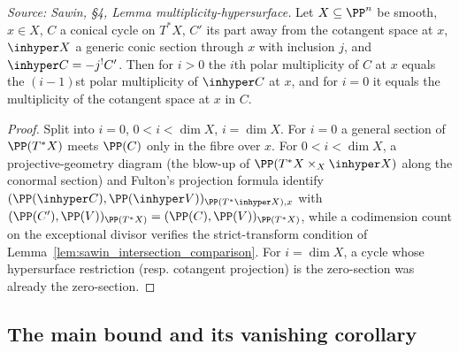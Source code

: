 \begin{lemma}
  \label{lem:sawin_multiplicity_hypersurface}
  \textit{Source: Sawin, §4, Lemma multiplicity-hypersurface.}
  Let $X\subseteq\PP^n$ be smooth, $x\in X$, $C$ a conical cycle on $T^*X$, $C'$ its
  part away from the cotangent space at $x$, $\inhyper X$ a generic conic section
  through $x$ with inclusion $j$, and $\inhyper C=-j^!C'$.  Then for $i>0$ the
  $i$th polar multiplicity of $C$ at $x$ equals the $(i-1)$st polar multiplicity
  of $\inhyper C$ at $x$, and for $i=0$ it equals the multiplicity of the
  cotangent space at $x$ in $C$.
\end{lemma}
\begin{proof}
  Split into $i=0$, $0<i<\dim X$, $i=\dim X$.  For $i=0$ a general section of
  $\PP(T^*X)$ meets $\PP(C)$ only in the fibre over $x$.  For $0<i<\dim X$, a
  projective-geometry diagram (the blow-up of $\PP(T^*X\times_X\inhyper X)$ along
  the conormal section) and Fulton's projection formula identify
  $(\PP(\inhyper C),\PP(\inhyper V))_{\PP(T^*\inhyper X),x}$ with
  $(\PP(C'),\PP(V))_{\PP(T^*X)}=(\PP(C),\PP(V))_{\PP(T^*X)}$, while a codimension
  count on the exceptional divisor verifies the strict-transform condition of
  Lemma~\ref{lem:sawin_intersection_comparison}.  For $i=\dim X$, a cycle whose
  hypersurface restriction (resp. cotangent projection) is the zero-section was
  already the zero-section.
\end{proof}

\subsection{The main bound and its vanishing corollary}


